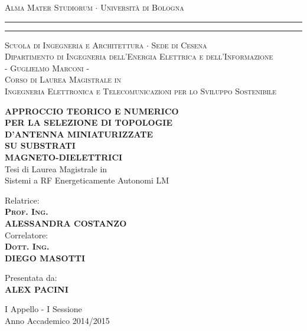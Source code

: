 \begin{titlepage}
\begin{center}
    {{\Large{\textsc{Alma Mater Studiorum $\cdot$ Universit\`a di
    Bologna}}}} \rule[0.1cm]{15.8cm}{0.1mm}
    \rule[0.5cm]{15.8cm}{0.6mm}
    {\small{\textsc { Scuola di Ingegneria e Architettura $\cdot$ Sede di Cesena\\
    Dipartimento di Ingegneria dell'Energia Elettrica e dell'Informazione
    \\ - Guglielmo Marconi -\\
    \vspace{5mm}
    Corso di Laurea Magistrale in \\
    Ingegneria Elettronica e Telecomunicazioni per lo Sviluppo Sostenibile}}}
\end{center}
\vspace{10mm}
\begin{center}
    {\LARGE\textbf{APPROCCIO TEORICO E NUMERICO}}\\
    \vspace{3mm}
    {\LARGE\textbf{PER LA SELEZIONE DI TOPOLOGIE}}\\
    \vspace{3mm}
    {\LARGE\textbf{ D'ANTENNA MINIATURIZZATE}}\\
    \vspace{3mm}
    {\LARGE{\bf SU SUBSTRATI}}\\
    \vspace{3mm}
    {\LARGE{\bf MAGNETO-DIELETTRICI}}\\
    \vspace{10mm} {\large{\sc Tesi di Laurea Magistrale in 
    \\ Sistemi a RF Energeticamente Autonomi LM}}
\end{center}
\vfill
\par
\noindent
\begin{minipage}[t]{0.47\textwidth}
    {\large{\sc Relatrice:}\\
    {\bf \textsc{Prof. Ing.\\
     ALESSANDRA COSTANZO}}}\\
    \vskip 8pt
    {\large{\sc Correlatore:}\\
    {\bf \textsc{Dott. Ing.\\
    DIEGO MASOTTI}}}
\end{minipage}
\hfill
\begin{minipage}[t]{0.47\textwidth}\raggedleft
    \vspace{10mm}
    {\large{\sc Presentata da:}\\
    \vspace{2mm}
    {\bf ALEX PACINI}}
\end{minipage}
\vspace{20mm}
\begin{center}
    {\large{\sc I Appello - I Sessione\\%
    Anno Accademico 2014/2015}}%
\end{center}
\end{titlepage}
\restoregeometry
